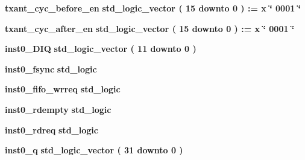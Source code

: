 \begin{DoxyCompactItemize}
\item 
{\bf txant\+\_\+cyc\+\_\+before\+\_\+en} {\bfseries \textcolor{comment}{std\+\_\+logic\+\_\+vector}\textcolor{vhdlchar}{ }\textcolor{vhdlchar}{(}\textcolor{vhdlchar}{ }\textcolor{vhdlchar}{ } \textcolor{vhdldigit}{15} \textcolor{vhdlchar}{ }\textcolor{keywordflow}{downto}\textcolor{vhdlchar}{ }\textcolor{vhdlchar}{ } \textcolor{vhdldigit}{0} \textcolor{vhdlchar}{ }\textcolor{vhdlchar}{)}\textcolor{vhdlchar}{ }\textcolor{vhdlchar}{ }\textcolor{vhdlchar}{ }\textcolor{vhdlchar}{\+:}\textcolor{vhdlchar}{=}\textcolor{vhdlchar}{ }\textcolor{vhdlchar}{ }\textcolor{vhdlchar}{x}\textcolor{vhdlchar}{ }\textcolor{keyword}{\char`\"{} 0001 \char`\"{}}\textcolor{vhdlchar}{ }} 
\item 
{\bf txant\+\_\+cyc\+\_\+after\+\_\+en} {\bfseries \textcolor{comment}{std\+\_\+logic\+\_\+vector}\textcolor{vhdlchar}{ }\textcolor{vhdlchar}{(}\textcolor{vhdlchar}{ }\textcolor{vhdlchar}{ } \textcolor{vhdldigit}{15} \textcolor{vhdlchar}{ }\textcolor{keywordflow}{downto}\textcolor{vhdlchar}{ }\textcolor{vhdlchar}{ } \textcolor{vhdldigit}{0} \textcolor{vhdlchar}{ }\textcolor{vhdlchar}{)}\textcolor{vhdlchar}{ }\textcolor{vhdlchar}{ }\textcolor{vhdlchar}{ }\textcolor{vhdlchar}{\+:}\textcolor{vhdlchar}{=}\textcolor{vhdlchar}{ }\textcolor{vhdlchar}{ }\textcolor{vhdlchar}{x}\textcolor{vhdlchar}{ }\textcolor{keyword}{\char`\"{} 0001 \char`\"{}}\textcolor{vhdlchar}{ }} 
\item 
{\bf inst0\+\_\+\+D\+IQ} {\bfseries \textcolor{comment}{std\+\_\+logic\+\_\+vector}\textcolor{vhdlchar}{ }\textcolor{vhdlchar}{(}\textcolor{vhdlchar}{ }\textcolor{vhdlchar}{ } \textcolor{vhdldigit}{11} \textcolor{vhdlchar}{ }\textcolor{keywordflow}{downto}\textcolor{vhdlchar}{ }\textcolor{vhdlchar}{ } \textcolor{vhdldigit}{0} \textcolor{vhdlchar}{ }\textcolor{vhdlchar}{)}\textcolor{vhdlchar}{ }} 
\item 
{\bf inst0\+\_\+fsync} {\bfseries \textcolor{comment}{std\+\_\+logic}\textcolor{vhdlchar}{ }} 
\item 
{\bf inst0\+\_\+fifo\+\_\+wrreq} {\bfseries \textcolor{comment}{std\+\_\+logic}\textcolor{vhdlchar}{ }} 
\item 
{\bf inst0\+\_\+rdempty} {\bfseries \textcolor{comment}{std\+\_\+logic}\textcolor{vhdlchar}{ }} 
\item 
{\bf inst0\+\_\+rdreq} {\bfseries \textcolor{comment}{std\+\_\+logic}\textcolor{vhdlchar}{ }} 
\item 
{\bf inst0\+\_\+q} {\bfseries \textcolor{comment}{std\+\_\+logic\+\_\+vector}\textcolor{vhdlchar}{ }\textcolor{vhdlchar}{(}\textcolor{vhdlchar}{ }\textcolor{vhdlchar}{ } \textcolor{vhdldigit}{31} \textcolor{vhdlchar}{ }\textcolor{keywordflow}{downto}\textcolor{vhdlchar}{ }\textcolor{vhdlchar}{ } \textcolor{vhdldigit}{0} \textcolor{vhdlchar}{ }\textcolor{vhdlchar}{)}\textcolor{vhdlchar}{ }} 

\end{DoxyCompactItemize}
